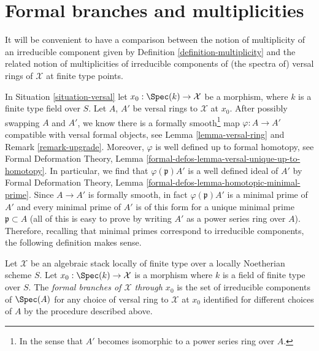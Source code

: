 \section{Formal branches and multiplicities}
\label{section-formal-branches}

\noindent
It will be convenient to have a comparison between the notion of multiplicity
of an irreducible component given by Definition \ref{definition-multiplicity}
and the related notion of multiplicities of irreducible components of
(the spectra of) versal rings of $\mathcal{X}$ at finite type points.

\medskip\noindent
In Situation \ref{situation-versal} let $x_0 : \Spec(k) \to \mathcal{X}$
be a morphism, where $k$ is a finite type field over $S$.
Let $A$, $A'$ be versal rings to $\mathcal{X}$ at $x_0$.
After possibly swapping $A$ and $A'$, we know there is a
formally smooth\footnote{In the sense that
$A'$ becomes isomorphic to a power series ring over $A$.}
map $\varphi : A \to A'$ compatible with versal formal objects, see
Lemma \ref{lemma-versal-ring} and
Remark \ref{remark-upgrade}.
Moreover, $\varphi$ is well defined up to formal homotopy, see
Formal Deformation Theory, Lemma
\ref{formal-defos-lemma-versal-unique-up-to-homotopy}.
In particular, we find that $\varphi(\mathfrak p)A'$ is a well
defined ideal of $A'$ by
Formal Deformation Theory, Lemma
\ref{formal-defos-lemma-homotopic-minimal-prime}.
Since $A \to A'$ is formally smooth, in fact
$\varphi(\mathfrak p)A'$ is a minimal prime of $A'$
and every minimal prime of $A'$ is of this form for
a unique minimal prime $\mathfrak p \subset A$ (all of this
is easy to prove by writing $A'$ as a power series ring over $A$).
Therefore, recalling that minimal primes correspond
to irreducible components, the following definition makes sense.

\begin{definition}
\label{definition-formal-branches}
Let $\mathcal{X}$ be an algebraic stack locally of finite type
over a locally Noetherian scheme $S$. Let $x_0 : \Spec(k) \to \mathcal{X}$
is a morphism where $k$ is a field of finite type over $S$.
The {\it formal branches of $\mathcal{X}$ through $x_0$}
is the set of irreducible components of $\Spec(A)$
for any choice of versal ring to $\mathcal{X}$ at $x_0$
identified for different choices of $A$ by the procedure described above.
\end{definition}

